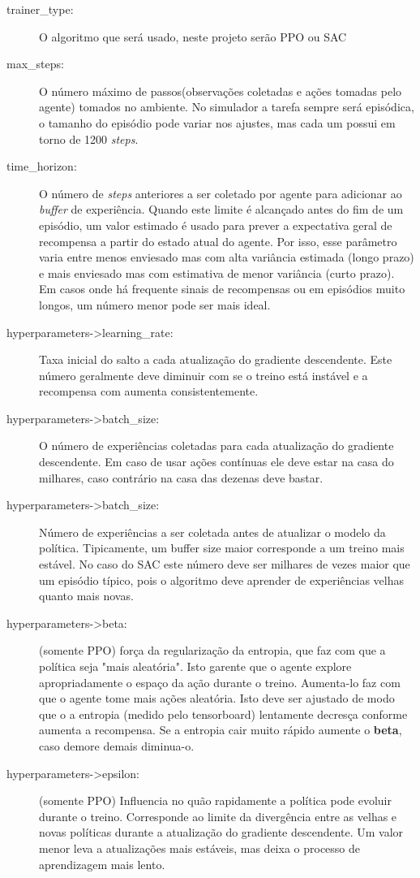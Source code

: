 \begin{description}
   \item [trainer\_type:] O algoritmo que será usado, neste projeto serão PPO ou SAC
   \item [max\_steps:] O número máximo de passos(observações coletadas e ações tomadas pelo agente) tomados  no ambiente. No simulador a tarefa sempre será episódica, o tamanho do episódio pode variar nos ajustes, mas cada um possui em torno de 1200 \textit{steps}.
   \item [time\_horizon:] O número de \textit{steps} anteriores a ser coletado por agente para adicionar ao \textit{buffer} de experiência. Quando este limite é alcançado antes do fim de um episódio, um valor estimado é usado para prever a expectativa geral de recompensa a partir do estado atual do agente. Por isso, esse parâmetro varia entre menos enviesado mas com alta variância estimada (longo prazo) e mais enviesado mas com estimativa de menor variância (curto prazo). Em casos onde há frequente sinais de recompensas ou em episódios muito longos, um número menor pode ser mais ideal.
   \item [hyperparameters->learning\_rate:] Taxa inicial do salto a cada atualização do gradiente descendente. Este número geralmente deve diminuir com se o treino está instável e a recompensa com aumenta consistentemente.
   \item [hyperparameters->batch\_size:] O número de experiências coletadas para cada atualização do gradiente descendente. Em caso de usar ações contínuas ele deve estar na casa do milhares, caso contrário na casa das dezenas deve bastar.
   \item [hyperparameters->batch\_size:] Número de experiências a ser coletada antes de atualizar o modelo da política. Tipicamente, um buffer size maior corresponde a um treino mais estável. No caso do SAC este número deve ser milhares de vezes maior que um episódio típico, pois o algoritmo deve aprender de experiências velhas quanto mais novas.
   \item [hyperparameters->beta:] (somente PPO) força da regularização da entropia, que faz com que a política seja "mais aleatória". Isto garente que o agente explore apropriadamente o espaço da ação durante o treino. Aumenta-lo faz com que o agente tome mais ações aleatória. Isto deve ser ajustado de modo que o a entropia (medido pelo tensorboard) lentamente decresça conforme aumenta a recompensa. Se a entropia cair muito rápido aumente o \textbf{beta}, caso demore demais diminua-o.
   \item [hyperparameters->epsilon:] (somente PPO) Influencia no quão rapidamente a política pode evoluir durante o treino. Corresponde ao limite da divergência entre as velhas e novas políticas durante a atualização do gradiente descendente. Um valor menor leva a atualizações mais estáveis, mas deixa o processo de aprendizagem mais lento.

\end{description}
